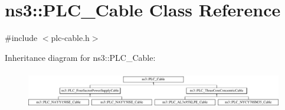 \hypertarget{classns3_1_1PLC__Cable}{\section{ns3\-:\-:\-P\-L\-C\-\_\-\-Cable \-Class \-Reference}
\label{classns3_1_1PLC__Cable}
}


{\ttfamily \#include $<$plc-\/cable.\-h$>$}

\-Inheritance diagram for ns3\-:\-:\-P\-L\-C\-\_\-\-Cable\-:\begin{figure}[H]
\begin{center}
\leavevmode
\includegraphics[height=1.686747cm]{classns3_1_1PLC__Cable}
\end{center}
\end{figure}
